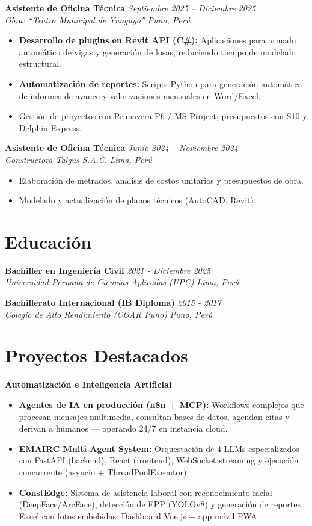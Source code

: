 \documentclass[10pt, a4paper]{article}
\newcommand{\entry}[4]{
    \textbf{#1} \hfill \textit{#2} \\
    \textit{#3} \hfill \textit{#4} \\
    \vspace{-1.5mm}
}
\begin{document}
\vspace{1mm}

\entry{Asistente de Oficina Técnica}{Septiembre 2025 – Diciembre 2025}{Obra: ``Teatro Municipal de Yunguyo''}{Puno, Perú}
\begin{itemize}
    \item \textbf{Desarrollo de plugins en Revit API (C\#):} Aplicaciones para armado automático de vigas y generación de losas, reduciendo tiempo de modelado estructural.
    \item \textbf{Automatización de reportes:} Scripts Python para generación automática de informes de avance y valorizaciones mensuales en Word/Excel.
    \item Gestión de proyectos con Primavera P6 / MS Project; presupuestos con S10 y Delphin Express.
\end{itemize}

\vspace{1mm}

\entry{Asistente de Oficina Técnica}{Junio 2024 – Noviembre 2024}{Constructora Talgus S.A.C.}{Lima, Perú}
\begin{itemize}
    \item Elaboración de metrados, análisis de costos unitarios y presupuestos de obra.
    \item Modelado y actualización de planos técnicos (AutoCAD, Revit).
\end{itemize}

\section*{Educación}
\entry{Bachiller en Ingeniería Civil}{2021 - Diciembre 2025}{Universidad Peruana de Ciencias Aplicadas (UPC)}{Lima, Perú}
\vspace{1mm}
\entry{Bachillerato Internacional (IB Diploma)}{2015 - 2017}{Colegio de Alto Rendimiento (COAR Puno)}{Puno, Perú}

\section*{Proyectos Destacados}

\textbf{Automatización e Inteligencia Artificial}
\begin{itemize}
    \item \textbf{Agentes de IA en producción (n8n + MCP):} Workflows complejos que procesan mensajes multimedia, consultan bases de datos, agendan citas y derivan a humanos — operando 24/7 en instancia cloud.
    \item \textbf{EMAIRC Multi-Agent System:} Orquestación de 4 LLMs especializados con FastAPI (backend), React (frontend), WebSocket streaming y ejecución concurrente (asyncio + ThreadPoolExecutor).
    \item \textbf{ConstEdge:} Sistema de asistencia laboral con reconocimiento facial (DeepFace/ArcFace), detección de EPP (YOLOv8) y generación de reportes Excel con fotos embebidas. Dashboard Vue.js + app móvil PWA.
\end{itemize}
\end{document}
